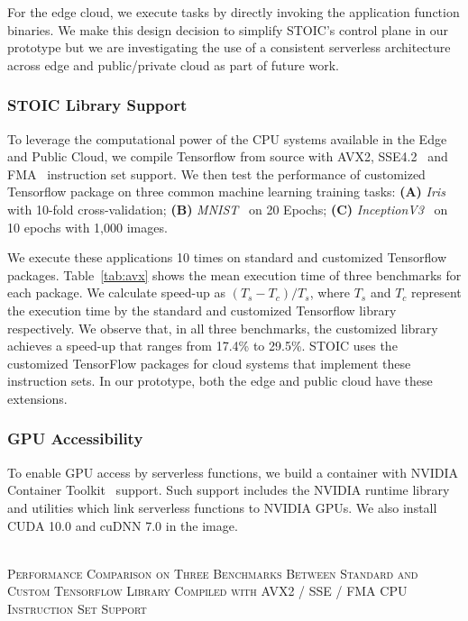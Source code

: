 For the edge cloud, we execute tasks by directly invoking
the application function binaries. We make this design decision to simplify STOIC's control plane in  our prototype but we are investigating the use of
a consistent serverless architecture across edge and public/private 
cloud as part of future work.
 
 \BlankLine
 \subsubsection{STOIC Library Support}
 To leverage the computational power of the CPU systems available 
in the Edge and Public Cloud, we compile Tensorflow from source with AVX2, SSE4.2~\cite{ref:avx} and FMA~\cite{ref:fma} instruction set support. We then test the performance of customized Tensorflow package on three common machine learning training tasks: \textbf{(A)} \textit{Iris}~\cite{ref:iris} with 10-fold cross-validation; \textbf{(B)} \textit{MNIST}~\cite{ref:mnist} on 20 Epochs; \textbf{(C)} \textit{InceptionV3}~\cite{ref:v3} on 10 epochs with 1,000 images. 

We execute these applications 10 times on standard and customized Tensorflow packages. Table~\ref{tab:avx} shows the mean execution time of three benchmarks 
for each package. We calculate speed-up as $(T_s - T_c) / T_s$, where $T_s$ and $T_c$ represent the execution time by the standard and customized Tensorflow library respectively. We observe that, in all three benchmarks, the customized library achieves a speed-up that ranges from 17.4\% to 29.5\%. STOIC uses
the customized TensorFlow packages for cloud systems that implement these
instruction sets.  In our prototype, both the edge and public cloud have
these extensions.
 
 \BlankLine
 \subsubsection{GPU Accessibility}
 To enable GPU access by serverless functions, we build a container with NVIDIA Container Toolkit~\cite{ref:nvidia} support.  Such support includes the NVIDIA runtime library and utilities which link serverless functions to NVIDIA GPUs. We also install CUDA 10.0 and cuDNN 7.0 in the image.
 
\begin{table}
\centering
\captionsetup{justification=centering}
\caption{ \hspace{0pt} \\
\textsc{Performance Comparison on Three Benchmarks Between Standard and Custom Tensorflow Library Compiled with AVX2 / SSE / FMA CPU Instruction Set Support}}

\label{tab:avx}
\end{table}
 
